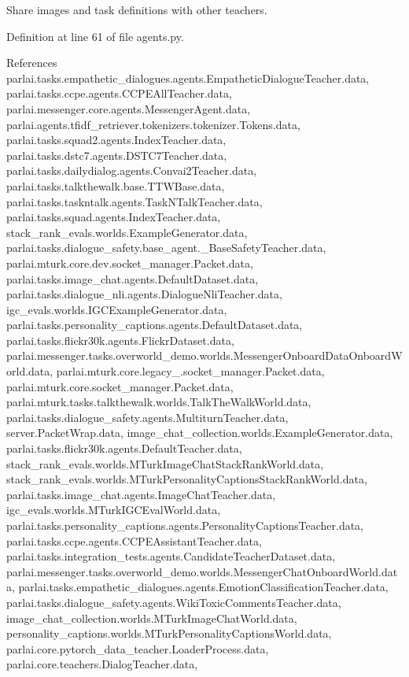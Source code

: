 \begin{DoxyVerb}Share images and task definitions with other teachers.\end{DoxyVerb}
 

Definition at line 61 of file agents.\+py.



References parlai.\+tasks.\+empathetic\+\_\+dialogues.\+agents.\+Empathetic\+Dialogue\+Teacher.\+data, parlai.\+tasks.\+ccpe.\+agents.\+C\+C\+P\+E\+All\+Teacher.\+data, parlai.\+messenger.\+core.\+agents.\+Messenger\+Agent.\+data, parlai.\+agents.\+tfidf\+\_\+retriever.\+tokenizers.\+tokenizer.\+Tokens.\+data, parlai.\+tasks.\+squad2.\+agents.\+Index\+Teacher.\+data, parlai.\+tasks.\+dstc7.\+agents.\+D\+S\+T\+C7\+Teacher.\+data, parlai.\+tasks.\+dailydialog.\+agents.\+Convai2\+Teacher.\+data, parlai.\+tasks.\+talkthewalk.\+base.\+T\+T\+W\+Base.\+data, parlai.\+tasks.\+taskntalk.\+agents.\+Task\+N\+Talk\+Teacher.\+data, parlai.\+tasks.\+squad.\+agents.\+Index\+Teacher.\+data, stack\+\_\+rank\+\_\+evals.\+worlds.\+Example\+Generator.\+data, parlai.\+tasks.\+dialogue\+\_\+safety.\+base\+\_\+agent.\+\_\+\+Base\+Safety\+Teacher.\+data, parlai.\+mturk.\+core.\+dev.\+socket\+\_\+manager.\+Packet.\+data, parlai.\+tasks.\+image\+\_\+chat.\+agents.\+Default\+Dataset.\+data, parlai.\+tasks.\+dialogue\+\_\+nli.\+agents.\+Dialogue\+Nli\+Teacher.\+data, igc\+\_\+evals.\+worlds.\+I\+G\+C\+Example\+Generator.\+data, parlai.\+tasks.\+personality\+\_\+captions.\+agents.\+Default\+Dataset.\+data, parlai.\+tasks.\+flickr30k.\+agents.\+Flickr\+Dataset.\+data, parlai.\+messenger.\+tasks.\+overworld\+\_\+demo.\+worlds.\+Messenger\+Onboard\+Data\+Onboard\+World.\+data, parlai.\+mturk.\+core.\+legacy\+\_.\+socket\+\_\+manager.\+Packet.\+data, parlai.\+mturk.\+core.\+socket\+\_\+manager.\+Packet.\+data, parlai.\+mturk.\+tasks.\+talkthewalk.\+worlds.\+Talk\+The\+Walk\+World.\+data, parlai.\+tasks.\+dialogue\+\_\+safety.\+agents.\+Multiturn\+Teacher.\+data, server.\+Packet\+Wrap.\+data, image\+\_\+chat\+\_\+collection.\+worlds.\+Example\+Generator.\+data, parlai.\+tasks.\+flickr30k.\+agents.\+Default\+Teacher.\+data, stack\+\_\+rank\+\_\+evals.\+worlds.\+M\+Turk\+Image\+Chat\+Stack\+Rank\+World.\+data, stack\+\_\+rank\+\_\+evals.\+worlds.\+M\+Turk\+Personality\+Captions\+Stack\+Rank\+World.\+data, parlai.\+tasks.\+image\+\_\+chat.\+agents.\+Image\+Chat\+Teacher.\+data, igc\+\_\+evals.\+worlds.\+M\+Turk\+I\+G\+C\+Eval\+World.\+data, parlai.\+tasks.\+personality\+\_\+captions.\+agents.\+Personality\+Captions\+Teacher.\+data, parlai.\+tasks.\+ccpe.\+agents.\+C\+C\+P\+E\+Assistant\+Teacher.\+data, parlai.\+tasks.\+integration\+\_\+tests.\+agents.\+Candidate\+Teacher\+Dataset.\+data, parlai.\+messenger.\+tasks.\+overworld\+\_\+demo.\+worlds.\+Messenger\+Chat\+Onboard\+World.\+data, parlai.\+tasks.\+empathetic\+\_\+dialogues.\+agents.\+Emotion\+Classification\+Teacher.\+data, parlai.\+tasks.\+dialogue\+\_\+safety.\+agents.\+Wiki\+Toxic\+Comments\+Teacher.\+data, image\+\_\+chat\+\_\+collection.\+worlds.\+M\+Turk\+Image\+Chat\+World.\+data, personality\+\_\+captions.\+worlds.\+M\+Turk\+Personality\+Captions\+World.\+data, parlai.\+core.\+pytorch\+\_\+data\+\_\+teacher.\+Loader\+Process.\+data, parlai.\+core.\+teachers.\+Dialog\+Teacher.\+data, 